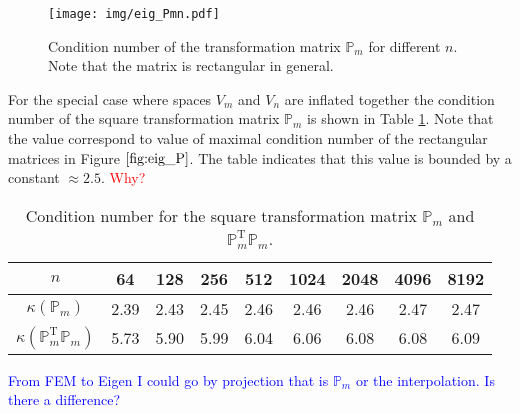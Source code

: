 \documentclass[a4paper,10pt]{article}
\newcommand{\Pmat}{\ensuremath{\mathbb{P}_m}}                  %
\newcommand{\Pmatt}{\ensuremath{\mathbb{P}_m^{\text{T}}}}       %
\newcommand{\TODO}[1]{\textcolor{red}{#1}}
\newcommand{\ASK}[1]{\textcolor{blue}{#1}}
\begin{document}
  \begin{figure}
  \begin{center}
    \texttt{[image: img/eig\_Pmn.pdf]}
  \end{center}
  \label{fig:eig_P}
  \caption{Condition number of the transformation matrix $\Pmat$ for different $n$.
    Note that the matrix is rectangular in general.}
  \end{figure}
  For the special case where spaces $V_m$ and $V_n$ are inflated together the
  condition number of the square transformation matrix $\Pmat$ is shown in
  Table \ref{tab:eig_P}. Note that the value correspond to value of maximal
  condition number of the rectangular matrices in Figure $\ref{fig:eig_P}$. 
  The table indicates that this value is bounded by a constant $\approx 2.5$.  
  \TODO{Why?}
  \begin{table}
    \begin{center}
    \begin{tabular}{|c||c|c|c|c|c|c|c|c|}
      \hline
      $n$           &   64&  128&  256&  512& 1024& 2048& 4096& 8192\\
      \hline\hline
      $\kappa(\Pmat)$ & 2.39& 2.43& 2.45& 2.46& 2.46& 2.46& 2.47& 2.47\\
      \hline
      $\kappa(\Pmatt\Pmat)$ & 5.73& 5.90& 5.99& 6.04& 6.06& 6.08& 6.08&
      6.09\\
      \hline
    \end{tabular}
  \caption{Condition number for the square transformation matrix $\Pmat$ and
  $\Pmatt\Pmat$.}
  \label{tab:eig_P}
  \end{center}
  \end{table}
  \ASK{From FEM to Eigen I could go by projection that is $\Pmat$ or the
  interpolation. Is there a difference?}
\end{document}
